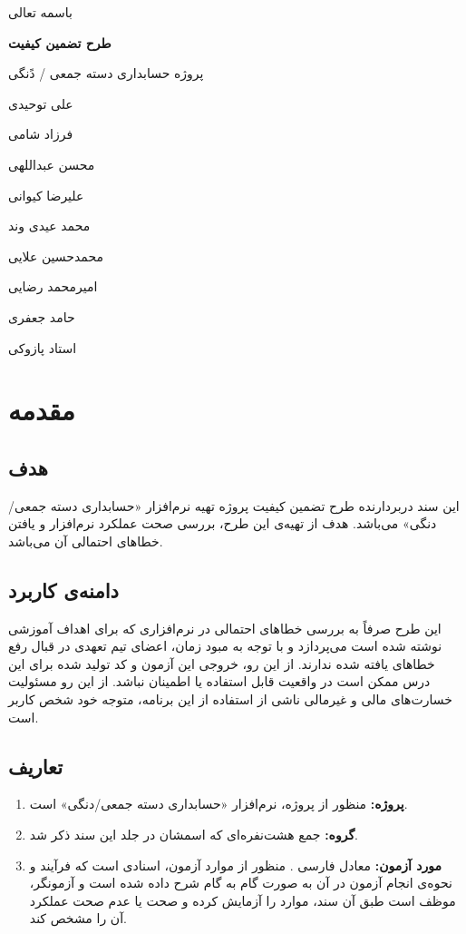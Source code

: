 \documentclass[12pt]{article}
\begin{document}
	\begin{titlepage}
		\centering
		{\large باسمه تعالی\par}
		\vspace{1.5cm}
		{\huge \bfseries طرح تضمین کیفیت\par}
		\vspace{2cm}
		{\LARGE پروژه حسابداری دسته جمعی / دًنگی\par}
		\vfill
		{\large علی توحیدی
\par	
فرزاد شامی
\par
محسن عبداللهی

\par
علیرضا کیوانی

\par
محمد عیدی وند

\par
محمدحسین علایی

\par
امیرمحمد رضایی

\par
حامد جعفری
}
		\vfill
		{\large استاد پازوکی}
	\end{titlepage}
	\tableofcontents
	\newpage
\section{مقدمه}
\subsection{هدف}
این سند دربردارنده طرح تضمین کیفیت پروژه تهیه نرم‌افزار «حسابداری دسته جمعی/دنگی» می‌باشد. هدف از تهیه‌ی این طرح، بررسی صحت عملکرد نرم‌افزار و یافتن خطاهای احتمالی آن می‌باشد.
\subsection{دامنه‌ی کاربرد}
این طرح صرفاً به بررسی خطاهای احتمالی در نرم‌افزاری که برای اهداف آموزشی نوشته شده است می‌پردازد و با توجه به مبود زمان، اعضای تیم تعهدی در قبال رفع خطاهای یافته شده ندارند. از این رو، خروجی این آزمون و کد تولید شده برای این درس ممکن است در واقعیت قابل استفاده  یا اطمینان نباشد. از این رو مسئولیت خسارت‌های مالی و غیرمالی ناشی از استفاده از این برنامه، متوجه خود شخص کاربر است.
\subsection{تعاریف}
\begin{enumerate}[ا)]
	\item \textbf{پروژه:}
	منظور از پروژه، نرم‌افزار «حسابداری دسته جمعی/دنگی» است.
	\item \textbf{گروه:}
جمع هشت‌نفره‌ای که اسمشان در جلد این سند ذکر شد.
	\item \textbf{مورد آزمون:}
معادل فارسی 
.
منظور از موارد آزمون، اسنادی است که فرآیند و نحوه‌ی انجام آزمون در آن به صورت گام به گام شرح داده شده است و آزمونگر، موظف است طبق آن سند، موارد را آزمایش کرده و صحت یا عدم صحت عملکرد آن را مشخص کند.
\end{enumerate}
\end{document}
